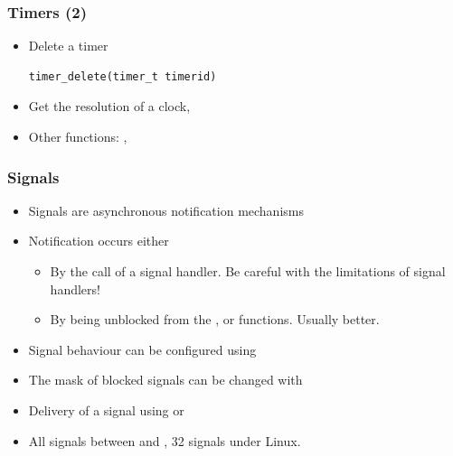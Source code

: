 \begin{frame}[fragile]
  \frametitle{Timers (2)}
  \begin{itemize}
  \item Delete a timer
    \begin{block}{}
\footnotesize
\begin{verbatim}
timer_delete(timer_t timerid)
\end{verbatim}
\small
    \end{block}
  \item Get the resolution of a clock, 
  \item Other functions: , 
  \end{itemize}
\end{frame}


\begin{frame}
  \frametitle{Signals}
  \begin{itemize}
  \item Signals are asynchronous notification mechanisms
  \item Notification occurs either
    \begin{itemize}
    \item By the call of a signal handler. Be careful with the limitations of signal
      handlers!
    \item By being unblocked from the ,
       or  functions. Usually
      better.
    \end{itemize}
  \item Signal behaviour can be configured using 
  \item The mask of blocked signals can be changed with
  \item Delivery of a signal using  or
  \item All signals between  and , 32
    signals under Linux.
  \end{itemize}
\end{frame}

